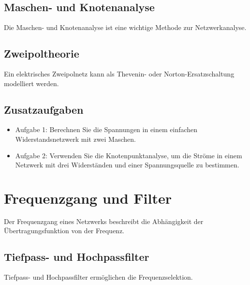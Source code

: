 \documentclass[11pt,a4paper]{article}
\begin{document}




\subsection{Maschen- und Knotenanalyse}
Die Maschen- und Knotenanalyse ist eine wichtige Methode zur Netzwerkanalyse.





\subsection{Zweipoltheorie}
Ein elektrisches Zweipolnetz kann als Thevenin- oder Norton-Ersatzschaltung modelliert werden.



\subsection{Zusatzaufgaben}
\begin{itemize}
	\item Aufgabe 1: Berechnen Sie die Spannungen in einem einfachen Widerstandsnetzwerk mit zwei Maschen.
	\item Aufgabe 2: Verwenden Sie die Knotenpunktanalyse, um die Ströme in einem Netzwerk mit drei Widerständen und einer Spannungsquelle zu bestimmen.
\end{itemize}


\vspace{1cm}
\section{Frequenzgang und Filter}
Der Frequenzgang eines Netzwerks beschreibt die Abhängigkeit der Übertragungsfunktion von der Frequenz.


\subsection{Tiefpass- und Hochpassfilter}
Tiefpass- und Hochpassfilter ermöglichen die Frequenzselektion.
\end{document}
